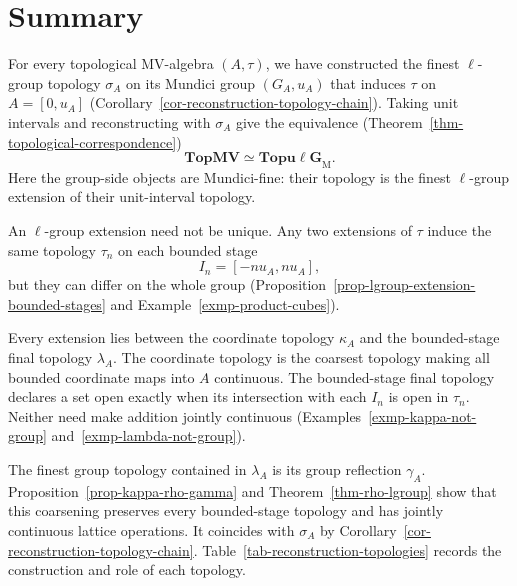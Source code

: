 \documentclass[preprint,3p]{elsarticle}
\theoremstyle{plain}
\theoremstyle{definition}
\newcommand{\TopMV}{\mathbf{TopMV}}
\newcommand{\TopulgM}{\mathbf{Topu\ell G}_{\mathrm{M}}}
\numberwithin{equation}{section}
\begin{document}
\section{Summary}
\label{sec-summary}

For every topological MV-algebra $(A,\tau)$, we have constructed
the finest $\ell$-group topology $\sigma_A$ on its Mundici group
$(G_A,u_A)$ that induces $\tau$ on $A=[0,u_A]$
(Corollary~\ref{cor-reconstruction-topology-chain}).
Taking unit intervals and reconstructing with $\sigma_A$ give
the equivalence (Theorem~\ref{thm-topological-correspondence})
\[ 
 \TopMV\simeq\TopulgM.
\]
Here the group-side objects are Mundici-fine: their topology is
the finest $\ell$-group extension of their unit-interval topology.

An $\ell$-group extension need not be unique.  Any two extensions
of $\tau$ induce the same topology $\tau_n$ on each bounded stage
\[ 
 I_n=[-nu_A,nu_A],
\]
but they can differ on the whole group
(Proposition~\ref{prop-lgroup-extension-bounded-stages} and
Example~\ref{exmp-product-cubes}).

Every extension lies between the coordinate topology $\kappa_A$
and the bounded-stage final topology $\lambda_A$.
The coordinate topology is the coarsest topology making all bounded
coordinate maps into $A$ continuous.  The bounded-stage final
topology declares a set open exactly when its intersection with
each $I_n$ is open in $\tau_n$.
Neither need make addition jointly continuous
(Examples~\ref{exmp-kappa-not-group} and~\ref{exmp-lambda-not-group}).

The finest group topology contained in $\lambda_A$ is its group
reflection $\gamma_A$.
Proposition~\ref{prop-kappa-rho-gamma} and
Theorem~\ref{thm-rho-lgroup} show that this coarsening preserves
every bounded-stage topology and has jointly continuous lattice
operations.  It coincides with $\sigma_A$ by
Corollary~\ref{cor-reconstruction-topology-chain}.
Table~\ref{tab-reconstruction-topologies} records the construction
and role of each topology.
\end{document}
